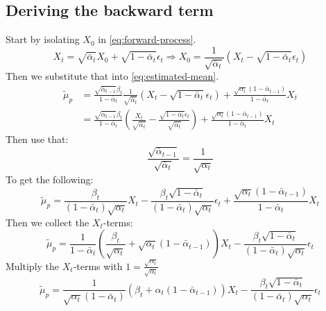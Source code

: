 \documentclass[a4paper, 12pt]{olplainarticle}
\begin{document}
\subsection{Deriving the backward term} \label{ap:backward-term}
Start by isolating $X_0$ in \cref{eq:forward-process}.
\begin{equation}
    X_t = \sqrt{\bar{\alpha}_t}X_0 + \sqrt{1-\bar{\alpha}_t}\epsilon_t \Rightarrow X_0 = \frac{1}{\sqrt{\bar{\alpha}_t}}(X_t - \sqrt{1-\bar{\alpha}_t} \epsilon_t)
\end{equation}
Then we substitute that into \cref{eq:estimated-mean}.
\begin{align}
    \tilde{\mu}_p &= \frac{\sqrt{\bar{\alpha}_{t-1}}\beta_t}{1-\bar{\alpha}_t} \frac{1}{\sqrt{\bar{\alpha}_t}} \left(X_t - \sqrt{1-\bar{\alpha}_t} \epsilon_t \right) + \frac{\sqrt{\alpha_t}(1-\bar{\alpha}_{t-1})}{1-\bar{\alpha}_t}X_t \\
    &= \frac{\sqrt{\bar{\alpha}_{t-1}}\beta_t}{1-\bar{\alpha}_t} \left( \frac{X_t}{\sqrt{\bar{\alpha}_t}} - \frac{\sqrt{1-\bar{\alpha}_t} \epsilon_t}{\sqrt{\bar{\alpha}_t}} \right) + \frac{\sqrt{\alpha_t}(1-\bar{\alpha}_{t-1})}{1-\bar{\alpha}_t}X_t
\end{align}
Then use that:
\begin{equation}
    \frac{\sqrt{\bar{\alpha}_{t-1}}}{\sqrt{\bar{\alpha}_t}} = \frac{1}{\sqrt{\alpha_t}}
\end{equation}
To get the following:
\begin{equation}
    \tilde{\mu}_p = \frac{\beta_t}{(1-\bar{\alpha}_t) \sqrt{\alpha_t}} X_t - \frac{\beta_t \sqrt{1-\bar{\alpha}_t} }{(1-\bar{\alpha}_t) \sqrt{\alpha_t}} \epsilon_t + \frac{\sqrt{\alpha_t}(1-\bar{\alpha}_{t-1})}{1-\bar{\alpha}_t}X_t
\end{equation}
Then we collect the $X_t$-terms:
\begin{equation}
    \tilde{\mu}_p = \frac{1}{1-\bar{\alpha}_{t}}\left( \frac{\beta_t}{\sqrt{\alpha_t}} + \sqrt{\alpha_t} (1-\bar{\alpha}_{t-1}) \right) X_t - \frac{\beta_t \sqrt{1-\bar{\alpha}_t} }{(1-\bar{\alpha}_t) \sqrt{\alpha_t}} \epsilon_t
\end{equation}
Multiply the $X_t$-terms with $1 = \frac{\sqrt{\alpha_t}}{\sqrt{\alpha_t}}$
\begin{equation}
    \tilde{\mu}_p = \frac{1}{\sqrt{\alpha_t} (1-\bar{\alpha}_{t})}\left( \beta_t + \alpha_t (1-\bar{\alpha}_{t-1}) \right) X_t - \frac{\beta_t \sqrt{1-\bar{\alpha}_t} }{(1-\bar{\alpha}_t) \sqrt{\alpha_t}} \epsilon_t
\end{equation}
\end{document}
